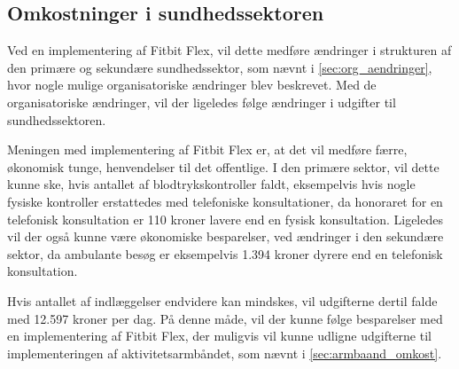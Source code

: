 \subsection{Omkostninger i sundhedssektoren}



Ved en implementering af Fitbit Flex, vil dette medføre ændringer i strukturen af den primære og sekundære sundhedssektor, som nævnt i \autoref{sec:org_aendringer}, hvor nogle mulige organisatoriske ændringer blev beskrevet. Med de organisatoriske ændringer, vil der ligeledes følge ændringer i udgifter til sundhedssektoren. 

Meningen med implementering af Fitbit Flex er, at det vil medføre færre, økonomisk tunge, henvendelser til det offentlige. I den primære sektor, vil dette kunne ske, hvis antallet af blodtrykskontroller faldt, eksempelvis hvis nogle fysiske kontroller erstattedes med telefoniske konsultationer, da honoraret for en telefonisk konsultation er 110 kroner lavere end en fysisk konsultation. Ligeledes vil der også kunne være økonomiske besparelser, ved ændringer i den sekundære sektor, da ambulante besøg er eksempelvis 1.394 kroner dyrere end en telefonisk konsultation. 

Hvis antallet af indlæggelser endvidere kan mindskes, vil udgifterne dertil falde med 12.597 kroner per dag. På denne måde, vil der kunne følge besparelser med en implementering af Fitbit Flex, der muligvis vil kunne udligne udgifterne til implementeringen af aktivitetsarmbåndet, som nævnt i \autoref{sec:armbaand_omkost}. 